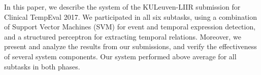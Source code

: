 In this paper, we describe the system of the KULeuven-LIIR submission for Clinical TempEval 2017. We participated in all six subtasks, using a combination of Support Vector Machines (SVM) for event and temporal expression detection, and a structured perceptron for extracting temporal relations. Moreover, we present and analyze the results from our submissions, and verify the effectiveness of several system components. Our system performed above average for all subtasks in both phases.
